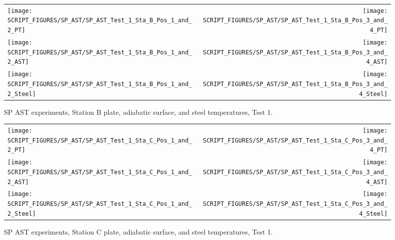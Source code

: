 \begin{figure}[p]
\begin{tabular*}{\textwidth}{l@{\extracolsep{\fill}}r}
\texttt{[image: SCRIPT\_FIGURES/SP\_AST/SP\_AST\_Test\_1\_Sta\_B\_Pos\_1\_and\_2\_PT]} &
\texttt{[image: SCRIPT\_FIGURES/SP\_AST/SP\_AST\_Test\_1\_Sta\_B\_Pos\_3\_and\_4\_PT]} \\
\texttt{[image: SCRIPT\_FIGURES/SP\_AST/SP\_AST\_Test\_1\_Sta\_B\_Pos\_1\_and\_2\_AST]} &
\texttt{[image: SCRIPT\_FIGURES/SP\_AST/SP\_AST\_Test\_1\_Sta\_B\_Pos\_3\_and\_4\_AST]} \\
\texttt{[image: SCRIPT\_FIGURES/SP\_AST/SP\_AST\_Test\_1\_Sta\_B\_Pos\_1\_and\_2\_Steel]} &
\texttt{[image: SCRIPT\_FIGURES/SP\_AST/SP\_AST\_Test\_1\_Sta\_B\_Pos\_3\_and\_4\_Steel]}
\end{tabular*}
\caption[SP AST experiments, Station B plate, adiabatic surface, and steel temperatures, Test 1]{SP AST experiments, Station B plate, adiabatic surface, and steel temperatures, Test 1.}
\label{SP_Test_1_Station_B}
\end{figure}

\begin{figure}[p]
\begin{tabular*}{\textwidth}{l@{\extracolsep{\fill}}r}
\texttt{[image: SCRIPT\_FIGURES/SP\_AST/SP\_AST\_Test\_1\_Sta\_C\_Pos\_1\_and\_2\_PT]} &
\texttt{[image: SCRIPT\_FIGURES/SP\_AST/SP\_AST\_Test\_1\_Sta\_C\_Pos\_3\_and\_4\_PT]} \\
\texttt{[image: SCRIPT\_FIGURES/SP\_AST/SP\_AST\_Test\_1\_Sta\_C\_Pos\_1\_and\_2\_AST]} &
\texttt{[image: SCRIPT\_FIGURES/SP\_AST/SP\_AST\_Test\_1\_Sta\_C\_Pos\_3\_and\_4\_AST]} \\
\texttt{[image: SCRIPT\_FIGURES/SP\_AST/SP\_AST\_Test\_1\_Sta\_C\_Pos\_1\_and\_2\_Steel]} &
\texttt{[image: SCRIPT\_FIGURES/SP\_AST/SP\_AST\_Test\_1\_Sta\_C\_Pos\_3\_and\_4\_Steel]}
\end{tabular*}
\caption[SP AST experiments, Station C plate, adiabatic surface, and steel temperatures, Test 1]{SP AST experiments, Station C plate, adiabatic surface, and steel temperatures, Test 1.}
\label{SP_Test_1_Station_C}
\end{figure}


